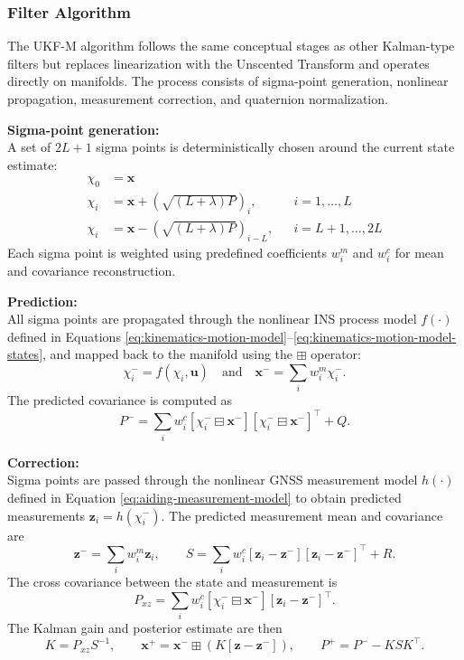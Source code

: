 \subsubsection{Filter Algorithm}
The UKF-M algorithm follows the same conceptual stages as other Kalman-type filters but replaces linearization with the Unscented Transform and operates directly on manifolds. The process consists of sigma-point generation, nonlinear propagation, measurement correction, and quaternion normalization.

\textbf{Sigma-point generation:} \\ \noindent
A set of $2L+1$ sigma points is deterministically chosen around the current state estimate:
$$
\begin{aligned}
    \chi_0 &= \mathbf{x} \\
    \chi_i &= \mathbf{x} + (\sqrt{(L + \lambda)P})_i,          && i = 1, \ldots, L \\
    \chi_i &= \mathbf{x} - (\sqrt{(L + \lambda)P})_{i - L},    && i = L+1, \ldots, 2L
\end{aligned}
$$
Each sigma point is weighted using predefined coefficients $w_i^m$ and $w_i^c$ for mean and covariance reconstruction.

\textbf{Prediction:} \\ \noindent
All sigma points are propagated through the nonlinear INS process model $f(\cdot)$ defined in Equations \ref{eq:kinematics-motion-model}–\ref{eq:kinematics-motion-model-states}, and mapped back to the manifold using the $\boxplus$ operator:
$$
    \chi_i^- = f(\chi_i, \mathbf{u}) \quad \text{and} \quad
    \mathbf{x}^- = \sum_i w_i^m \chi_i^-.
$$
The predicted covariance is computed as
$$
    P^- = \sum_i w_i^c [\chi_i^- \boxminus \mathbf{x}^-][\chi_i^- \boxminus \mathbf{x}^-]^\top + Q.
$$

\textbf{Correction:} \\ \noindent
Sigma points are passed through the nonlinear GNSS measurement model $h(\cdot)$ defined in Equation \ref{eq:aiding-measurement-model} to obtain predicted measurements $\mathbf{z}_i = h(\chi_i^-)$.  
The predicted measurement mean and covariance are
$$
\mathbf{z}^- = \sum_i w_i^m \mathbf{z}_i, \qquad
S = \sum_i w_i^c [\mathbf{z}_i - \mathbf{z}^-][\mathbf{z}_i - \mathbf{z}^-]^\top + R.
$$
The cross covariance between the state and measurement is
$$
P_{xz} = \sum_i w_i^c [\chi_i^- \boxminus \mathbf{x}^-][\mathbf{z}_i - \mathbf{z}^-]^\top.
$$
The Kalman gain and posterior estimate are then
$$
K = P_{xz} S^{-1}, \qquad
\mathbf{x}^+ = \mathbf{x}^- \boxplus (K [\mathbf{z} - \mathbf{z}^-]), \qquad
P^+ = P^- - K S K^\top.
$$

